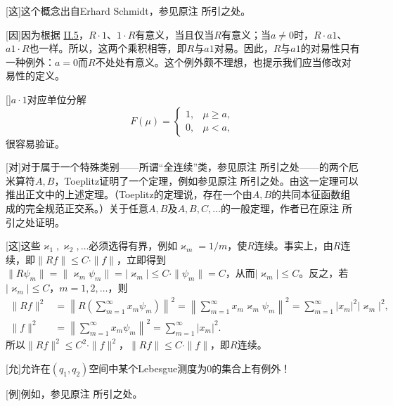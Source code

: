 \documentclass[fontsize=13pt,twoside,openany,headings=normal,parskip=false,bookmarkpackage=false,DIV=calc]{scrbook}
\begin{document}
[这]{这个概念出自Erhard Schmidt，参见原注 \hyperlink{note-78}{} 所引之处。}

[因]{因为根据 \hyperref[sec:II.5]{II.5}，$R\cdot1$、$1\cdot R$有意义，当且仅当$R$有意义；当$a\ne0$时，$R\cdot a1$、$a1\cdot R$也一样。所以，这两个乘积相等，即$R$与$a1$对易。因此，$R$与$a1$的对易性只有一种例外：$a=0$而$R$不处处有意义。这个例外颇不理想，也提示我们应当修改对易性的定义。}

[]{$a\cdot1$对应单位分解
\[
F(\mu)=\begin{cases}1,&\mu\ge a,\\0,&\mu<a,\end{cases}
\]
很容易验证。}

[对]{对于属于一个特殊类别——所谓“全连续”类，参见原注 \hyperlink{note-70}{} 所引之处——的两个厄米算符$A,\allowbreak B$，Toeplitz证明了一个定理，例如参见原注 \hyperlink{note-33}{} 所引之处。由这一定理可以推出正文中的上述定理。（Toeplitz的定理说，存在一个由$A,\allowbreak B$的共同本征函数组成的完全规范正交系。）关于任意$A,\allowbreak B$及$A,\allowbreak B,\allowbreak C,\allowbreak \ldots$的一般定理，作者已在原注 \hyperlink{note-94}{} 所引之处证明。}

[这]{这些$\varkappa_1,\allowbreak \varkappa_2,\allowbreak \ldots$必须选得有界，例如$\varkappa_m=1/m$，使$R$连续。事实上，由$R$连续，即$\|Rf\|\le C\cdot\|f\|$，立即得到$\|R\psi_m\|=\|\varkappa_m\psi_m\|=|\varkappa_m|\le C\cdot\|\psi_m\|=C$，从而$|\varkappa_m|\le C$。反之，若$|\varkappa_m|\le C$，$m=1,\allowbreak 2,\allowbreak \ldots$，则
\begin{align*}
\|Rf\|^2&=\left\|R\left(\sum_{m=1}^{\infty}x_m\psi_m\right)\right\|^2
=\left\|\sum_{m=1}^{\infty}x_m\varkappa_m\psi_m\right\|^2
=\sum_{m=1}^{\infty}|x_m|^2|\varkappa_m|^2,\\
\|f\|^2&=\left\|\sum_{m=1}^{\infty}x_m\psi_m\right\|^2
=\sum_{m=1}^{\infty}|x_m|^2.
\end{align*}
所以$\|Rf\|^2\le C^2\cdot\|f\|^2$，$\|Rf\|\le C\cdot\|f\|$，即$R$连续。}

[允]{允许在$(q_1,\allowbreak q_2)$空间中某个Lebesgue测度为$0$的集合上有例外！}

[例]{例如，参见原注 \hyperlink{note-45}{} 所引之处。}
\end{document}
